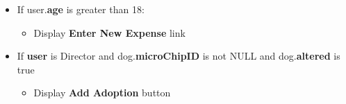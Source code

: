 \documentclass{article}
\begin{document}
\begin{itemize}
\begin{itemize}
\begin{itemize}
\begin{Verbatim} [frame=single]
GROUP BY e.category 
ORDER BY totalExpense DESC;
            \end{Verbatim}
            \begin{Verbatim} [frame=single]
SELECT SUM(e.amount) AS grandTotal 
FROM Expense e 
WHERE e.dogID = @dogID;
            \end{Verbatim}
            \item \textbf{totalExpense} per vendor
            \item Add all \textbf{totalExpense} and display as \textbf{grandTotal}
        \end{itemize}
        \item If user.\textbf{age} is greater than 18:
        \begin{itemize}
            \begin{Verbatim} [frame=single]
SELECT v.email 
FROM Volunteer v 
WHERE TIMESTAMPDIFF(YEAR, v.birth_date, CURDATE()) 
>= 18 AND v.email = @user.emailAddress;
            \end{Verbatim}
            \footnote{TIMESTAMPDIFF() is a function in MySQL See \url{https://www.geeksforgeeks.org/timestampdiff-function-in-mysql/}}
             \footnote{CURDATE() is a function in MySQL See \url{https://www.geeksforgeeks.org/mysql-group_concat-function/}}
            \item Display \textbf{Enter New Expense} link
        \end{itemize}
        \item If \textbf{user} is Director and dog.\textbf{microChipID} is not NULL and dog.\textbf{altered} is true
        \begin{itemize}
        \begin{Verbatim} [frame=single]
SELECT d.dogID, d.name, d.altered, dm.microchipID 
FROM Dog d
LEFT JOIN DogMicrochip dm ON d.dogID = dm.dogID
WHERE d.dogID = @dogID
AND d.altered = TRUE 
AND dm.microchipID IS NOT NULL; 
            \end{Verbatim}
            \item Display \textbf{Add Adoption} button
        \end{itemize}
    \end{itemize}
\end{itemize}
\end{document}
